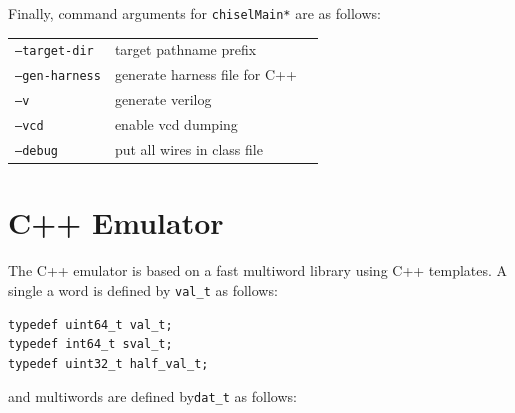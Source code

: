 \documentclass[10pt,twocolumn]{article}
\def\code#1{{\small\tt #1}}
\begin{document}
Finally, command arguments for \code{chiselMain*} are as follows: \\

\begin{tabular}{lll}
\code{--target-dir} & target pathname prefix \\
\code{--gen-harness} & generate harness file for C++ \\
\code{--v} & generate verilog \\
\code{--vcd} & enable vcd dumping \\
\code{--debug} & put all wires in class file \\
\end{tabular}


\section{C++ Emulator}

The C++ emulator is based on a fast multiword library using
C++ templates.  A single a
word is defined by \code{val\_t} as follows: 

\lstset{language=C++}

\begin{lstlisting}
typedef uint64_t val_t;
typedef int64_t sval_t; 
typedef uint32_t half_val_t;
\end{lstlisting}

\noindent
and multiwords are defined by\code{dat\_t} as follows:
\end{document}
